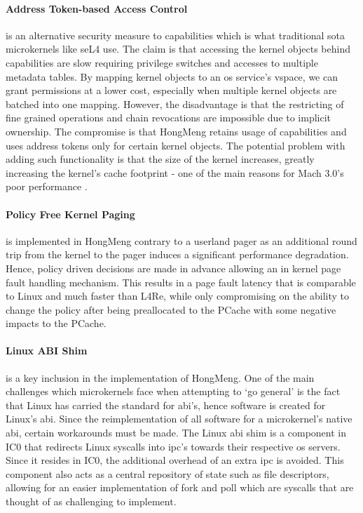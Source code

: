 \documentclass[literature_review.tex]{subfiles}
\begin{document}
\paragraph{Address Token-based Access Control} is an alternative security measure to capabilities which is what traditional \gls{sota} microkernels like seL4 use. The claim is that accessing the kernel objects behind capabilities are slow requiring privilege switches and accesses to multiple metadata tables. By mapping kernel objects to an \gls{os} service's vspace, we can grant permissions at a lower cost, especially when multiple kernel objects are batched into one mapping. However, the disadvantage is that the restricting of fine grained operations and chain revocations are impossible due to implicit ownership. The compromise is that HongMeng retains usage of capabilities and uses address tokens only for certain kernel objects. The potential problem with adding such functionality is that the size of the kernel increases, greatly increasing the kernel's cache footprint - one of the main reasons for Mach 3.0's poor performance \citep{Chen_Bershad_93, Liedtke_96b}.

\paragraph{Policy Free Kernel Paging} is implemented in HongMeng contrary to a userland pager as an additional round trip from the kernel to the pager induces a significant performance degradation. Hence, policy driven decisions are made in advance allowing an in kernel page fault handling mechanism. This results in a page fault latency that is comparable to Linux and much faster than L4Re, while only compromising on the ability to change the policy after being preallocated to the PCache with some negative impacts to the PCache.

\paragraph{Linux ABI Shim} is a key inclusion in the implementation of HongMeng. One of the main challenges which microkernels face when attempting to `go general' is the fact that Linux has carried the standard for \gls{abi}'s, hence software is created for Linux's \gls{abi}. Since the reimplementation of all software for a microkernel's native \gls{abi}, certain workarounds must be made. The Linux \gls{abi} shim is a component in IC0 that redirects Linux syscalls into \gls{ipc}'s towards their respective \gls{os} servers. Since it resides in IC0, the additional overhead of an extra \gls{ipc} is avoided. This component also acts as a central repository of state such as file descriptors, allowing for an easier implementation of fork and poll which are syscalls that are thought of as challenging to implement.
\end{document}
